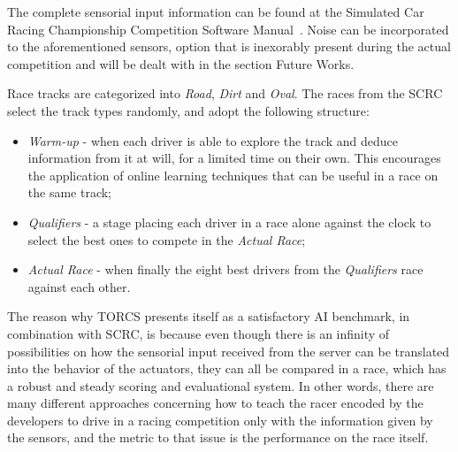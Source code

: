 	The complete sensorial input information can be found at the Simulated Car Racing Championship Competition
	Software Manual~\cite{SCRC}. Noise can be incorporated to the aforementioned sensors,
	option that is inexorably present during the actual competition and will be dealt with in the section Future
	Works.

	Race tracks %
	are categorized into \emph{Road}, \emph{Dirt} and \emph{Oval}. The races from the SCRC select the track types
	randomly, and adopt the following structure:

		\begin{itemize}

			\item \emph{Warm-up} - when each driver is able to explore the track and deduce information from it	at
			will, for a limited time on their own. This encourages the application of online learning techniques
			that can be useful in a race on the same track;

			\item \emph{Qualifiers} - a stage placing each driver in a race alone against the clock to select the best
			ones to compete in the \emph{Actual Race};

			\item \emph{Actual Race} - when finally the eight best drivers from the \emph{Qualifiers} race against
			each other.

		\end{itemize}

	The reason why TORCS presents itself as a satisfactory AI benchmark, in combination with SCRC, is because even
	though there is an infinity  of possibilities on how the sensorial input received from the server can be
	translated into the behavior of the actuators, they can all be compared in a race, which has a robust and steady
	scoring and evaluational system. In other words, there are many different approaches concerning how to teach the
	racer encoded by the developers to drive in a racing competition only with the information given by the sensors,
	and the metric to that issue is the performance on the race itself.

